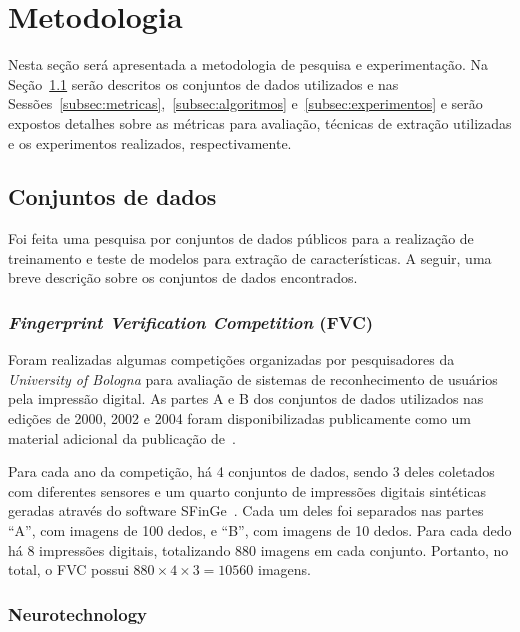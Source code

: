 \section{Metodologia}\label{sec:metodologia}

Nesta seção será apresentada a metodologia de pesquisa e experimentação. Na Seção~\ref{subsec:dataset} serão descritos os conjuntos de dados utilizados e nas Sessões~\ref{subsec:metricas},~\ref{subsec:algoritmos} e~\ref{subsec:experimentos} e serão expostos detalhes sobre as métricas para avaliação, técnicas de extração utilizadas e os experimentos realizados, respectivamente.


\subsection{Conjuntos de dados}\label{subsec:dataset}

Foi feita uma pesquisa por conjuntos de dados públicos para a realização de treinamento e teste de modelos para extração de características. A seguir, uma breve descrição sobre os conjuntos de dados encontrados.


\subsubsection{\textit{Fingerprint Verification Competition} (FVC)}\label{subsubsec:fvc}

Foram realizadas algumas competições organizadas por pesquisadores da \textit{University of Bologna} para avaliação de sistemas de reconhecimento de usuários pela impressão digital. As partes A e B dos conjuntos de dados utilizados nas edições de 2000, 2002 e 2004 foram disponibilizadas publicamente como um material adicional da publicação de~.

Para cada ano da competição, há 4 conjuntos de dados, sendo 3 deles coletados com diferentes sensores e um quarto conjunto de impressões digitais sintéticas geradas através do software SFinGe~\cite{handbook_of_fp_recognition}. Cada um deles foi separados nas partes ``A'', com imagens de 100 dedos, e ``B'', com imagens de 10 dedos. Para cada dedo há 8 impressões digitais, totalizando 880 imagens em cada conjunto. Portanto, no total, o FVC possui $880 \times 4 \times 3 = 10560$ imagens.


\subsubsection{Neurotechnology}\label{subsubsec:neurotechnology}

